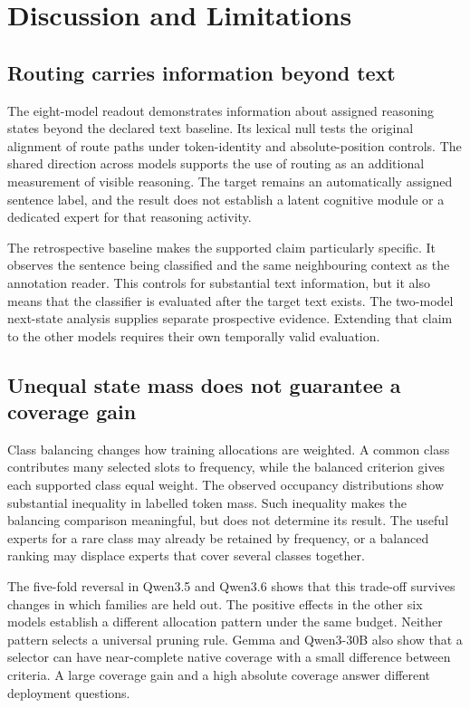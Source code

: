 \section{Discussion and Limitations}
\label{sec:discussion}

\subsection{Routing carries information beyond text}

The eight-model readout demonstrates information about assigned reasoning states beyond the declared text baseline.
%
Its lexical null tests the original alignment of route paths under token-identity and absolute-position controls.
%
The shared direction across models supports the use of routing as an additional measurement of visible reasoning.
%
The target remains an automatically assigned sentence label, and the result does not establish a latent cognitive module or a dedicated expert for that reasoning activity.
%

The retrospective baseline makes the supported claim particularly specific.
%
It observes the sentence being classified and the same neighbouring context as the annotation reader.
%
This controls for substantial text information, but it also means that the classifier is evaluated after the target text exists.
%
The two-model next-state analysis supplies separate prospective evidence.
%
Extending that claim to the other models requires their own temporally valid evaluation.
%

\subsection{Unequal state mass does not guarantee a coverage gain}

Class balancing changes how training allocations are weighted.
%
A common class contributes many selected slots to frequency, while the balanced criterion gives each supported class equal weight.
%
The observed occupancy distributions show substantial inequality in labelled token mass.
%
Such inequality makes the balancing comparison meaningful, but does not determine its result.
%
The useful experts for a rare class may already be retained by frequency, or a balanced ranking may displace experts that cover several classes together.
%

The five-fold reversal in Qwen3.5 and Qwen3.6 shows that this trade-off survives changes in which families are held out.
%
The positive effects in the other six models establish a different allocation pattern under the same budget.
%
Neither pattern selects a universal pruning rule.
%
Gemma and Qwen3-30B also show that a selector can have near-complete native coverage with a small difference between criteria.
%
A large coverage gain and a high absolute coverage answer different deployment questions.
%

